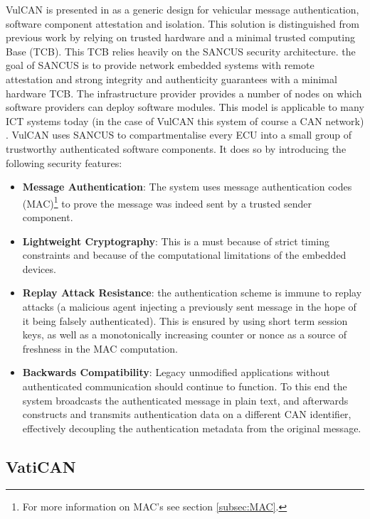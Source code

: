 VulCAN is presented in \cite{VulCAN} as a generic design for vehicular message authentication, software component attestation and isolation. This solution is distinguished from previous work by relying on trusted hardware and a minimal trusted computing Base (TCB). This TCB relies heavily on the SANCUS security architecture. the goal of SANCUS is to provide network embedded systems with remote attestation and strong integrity and authenticity guarantees with a minimal hardware TCB. The infrastructure provider provides a number of nodes on which software providers can deploy software modules. This model is applicable to many ICT systems today (in the case of VulCAN this system of course a CAN network) \cite{Sancus}. VulCAN uses SANCUS to compartmentalise every ECU into a small group of trustworthy authenticated software components. It does so by introducing the following security features: 

\begin{itemize}
	\item \textbf{Message Authentication}: The system uses message authentication codes (MAC)\footnote{For more information on MAC's see section \ref{subsec:MAC}.} to prove the message was indeed sent by a trusted sender component.
	
	\item \textbf{Lightweight Cryptography}: This is a must because of strict timing constraints and because of the computational limitations of the embedded devices. 
	
	\item \textbf{Replay Attack Resistance}: the authentication scheme is immune to replay attacks (a malicious agent injecting a previously sent message in the hope of it being falsely authenticated). This is ensured by using short term session keys, as well as a monotonically increasing counter or nonce as a source of freshness in the MAC computation.
	
	\item \textbf{Backwards Compatibility}: Legacy unmodified applications without authenticated communication should continue to function. To this end the system broadcasts the authenticated message in plain text, and afterwards constructs and transmits authentication data on a different CAN identifier, effectively decoupling the authentication metadata from the original message.
\end{itemize}

\subsection{VatiCAN} 
\label{subsec:vatican}

